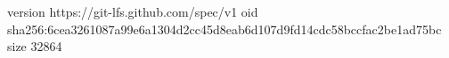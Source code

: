 version https://git-lfs.github.com/spec/v1
oid sha256:6cea3261087a99e6a1304d2cc45d8eab6d107d9fd14cdc58bccfac2be1ad75bc
size 32864
